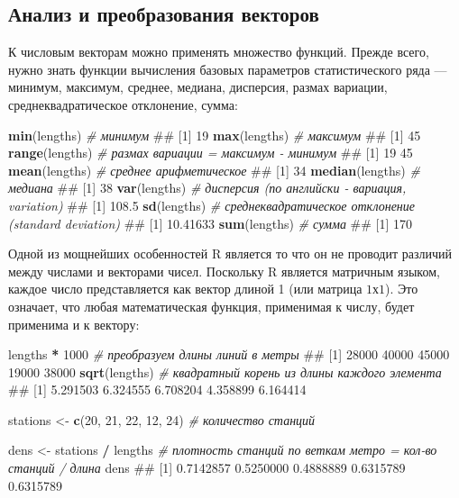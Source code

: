 \documentclass[]{book}
\newenvironment{Shaded}{\begin{snugshade}}{\end{snugshade}}
\newcommand{\KeywordTok}[1]{\textcolor[rgb]{0.13,0.29,0.53}{\textbf{#1}}}
\newcommand{\DecValTok}[1]{\textcolor[rgb]{0.00,0.00,0.81}{#1}}
\newcommand{\StringTok}[1]{\textcolor[rgb]{0.31,0.60,0.02}{#1}}
\newcommand{\CommentTok}[1]{\textcolor[rgb]{0.56,0.35,0.01}{\textit{#1}}}
\newcommand{\OperatorTok}[1]{\textcolor[rgb]{0.81,0.36,0.00}{\textbf{#1}}}
\newcommand{\NormalTok}[1]{#1}
\begin{document}
\subsection{Анализ и преобразования векторов}\label{vector_transform}

К числовым векторам можно применять множество функций. Прежде всего,
нужно знать функции вычисления базовых параметров статистического ряда
--- минимум, максимум, среднее, медиана, дисперсия, размах вариации,
среднеквадратическое отклонение, сумма:

\begin{Shaded}
\begin{Highlighting}[]
\KeywordTok{min}\NormalTok{(lengths) }\CommentTok{# минимум}
\NormalTok{## [1] 19}
\KeywordTok{max}\NormalTok{(lengths) }\CommentTok{# максимум}
\NormalTok{## [1] 45}
\KeywordTok{range}\NormalTok{(lengths) }\CommentTok{# размах вариации = максимум - минимум}
\NormalTok{## [1] 19 45}
\KeywordTok{mean}\NormalTok{(lengths) }\CommentTok{# среднее арифметическое}
\NormalTok{## [1] 34}
\KeywordTok{median}\NormalTok{(lengths) }\CommentTok{# медиана}
\NormalTok{## [1] 38}
\KeywordTok{var}\NormalTok{(lengths) }\CommentTok{# дисперсия (по английски - вариация, variation)}
\NormalTok{## [1] 108.5}
\KeywordTok{sd}\NormalTok{(lengths) }\CommentTok{# среднеквадратическое отклонение (standard deviation)}
\NormalTok{## [1] 10.41633}
\KeywordTok{sum}\NormalTok{(lengths) }\CommentTok{# сумма}
\NormalTok{## [1] 170}
\end{Highlighting}
\end{Shaded}

Одной из мощнейших особенностей R является то что он не проводит
различий между числами и векторами чисел. Поскольку R является матричным
языком, каждое число представляется как вектор длиной 1 (или матрица
\(1х1\)). Это означает, что любая математическая функция, применимая к
числу, будет применима и к вектору:

\begin{Shaded}
\begin{Highlighting}[]
\NormalTok{lengths }\OperatorTok{*}\StringTok{ }\DecValTok{1000} \CommentTok{# преобразуем длины линий в метры}
\NormalTok{## [1] 28000 40000 45000 19000 38000}
\KeywordTok{sqrt}\NormalTok{(lengths) }\CommentTok{# квадратный корень из длины каждого элемента}
\NormalTok{## [1] 5.291503 6.324555 6.708204 4.358899 6.164414}

\NormalTok{stations <-}\StringTok{ }\KeywordTok{c}\NormalTok{(}\DecValTok{20}\NormalTok{, }\DecValTok{21}\NormalTok{, }\DecValTok{22}\NormalTok{, }\DecValTok{12}\NormalTok{, }\DecValTok{24}\NormalTok{) }\CommentTok{# количество станций}

\NormalTok{dens <-}\StringTok{ }\NormalTok{stations }\OperatorTok{/}\StringTok{ }\NormalTok{lengths }\CommentTok{# плотность станций по веткам метро = кол-во станций / длина }
\NormalTok{dens}
\NormalTok{## [1] 0.7142857 0.5250000 0.4888889 0.6315789 0.6315789}
\end{Highlighting}
\end{Shaded}
\end{document}
